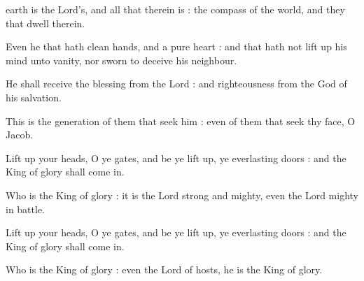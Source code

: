 

 earth is the Lord's, and all that therein is : the compass of the world, and they that dwell therein.\par
{}
Even he that hath clean hands, and a pure heart : and that hath not lift up his mind unto vanity, nor sworn to deceive his neighbour.\par
{}He shall receive the blessing from the Lord : and righteousness from the God of his salvation.\par
{}This is the generation of them that seek him : even of them that seek thy face, O Jacob.\par
{}Lift up your heads, O ye gates, and be ye lift up, ye everlasting doors : and the King of glory shall come in.\par
{}Who is the King of glory : it is the Lord strong and mighty, even the Lord mighty in battle.\par
{}Lift up your heads, O ye gates, and be ye lift up, ye everlasting doors : and the King of glory shall come in.\par
{}Who is the King of glory : even the Lord of hosts, he is the King of glory.\par



